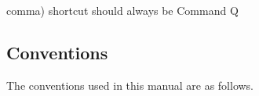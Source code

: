 %
%
comma)
shortcut should always be Command Q
\newcommand{\nix}[1]{\texttt{[image: nix.eps]} #1}
\newcommand{\win}[1]{\texttt{[image: win.eps]} #1}
\newcommand{\osx}[1]{\texttt{[image: osx.eps]} #1}
%
\newcommand{\nixcaption}{\protect\texttt{[image: nix.eps]}}
\newcommand{\wincaption}{\protect\texttt{[image: win.eps]}}
\newcommand{\osxcaption}{\protect\texttt{[image: osx.eps]}}


\newcommand{\qtmainmenuopt}[1]{\textsf{#1}}
\newcommand{\qtdropmenuopt}[1]{\textsf{#1}}
\newcommand{\qtdialog}[1]{\textsf{#1}}

 

%
\subsection{Conventions}\label{label_conventions}

The conventions used in this manual are as follows. 

